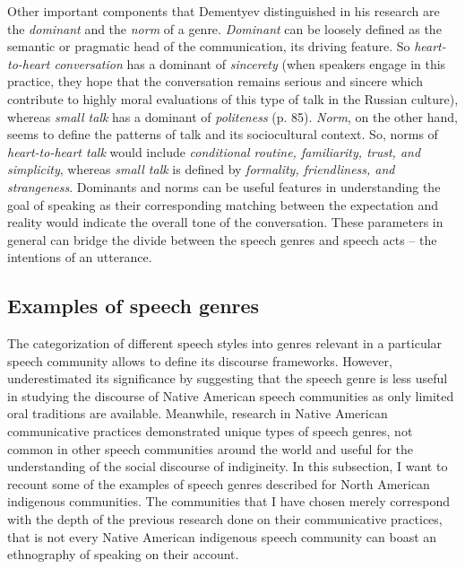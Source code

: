 \documentclass[12pt]{article}
\begin{document}
Other important components that Dementyev distinguished in his research are the \textit{dominant} and the \textit{norm} of a genre. \textit{Dominant} can be loosely defined as the semantic or pragmatic head of the communication, its driving feature. So \textit{heart-to-heart conversation} has a dominant of \textit{sincerety} (when speakers engage in this practice, they hope that the conversation remains serious and sincere which contribute to highly moral evaluations of this type of talk in the Russian culture), whereas \textit{small talk} has a dominant of \textit{politeness} (p. 85). \textit{Norm}, on the other hand, seems to define the patterns of talk and its sociocultural context. So, norms of \textit{heart-to-heart talk} would include \textit{conditional routine, familiarity, trust, and simplicity}, whereas \textit{small talk} is defined by \textit{formality, friendliness, and strangeness}. Dominants and norms can be useful features in understanding the goal of speaking as their corresponding matching between the expectation and reality would indicate the overall tone of the conversation. These parameters in general can bridge the divide between the speech genres and speech acts -- the intentions of an utterance. 
\subsection{Examples of speech genres}

The categorization of different speech styles into genres relevant in a particular speech community allows to define its discourse frameworks. However, \textcite[p. 102]{dementyev2015} underestimated its significance by suggesting that the speech genre is less useful in studying the discourse of Native American speech communities as only limited oral traditions are available. Meanwhile, research in Native American communicative practices demonstrated unique types of speech genres, not common in other speech communities around the world and useful for the understanding of the social discourse of indigineity. In this subsection, I want to recount some of the examples of speech genres described for North American indigenous communities. The communities that I have chosen merely correspond with the depth of the previous research done on their communicative practices, that is not every Native American indigenous speech community can boast an ethnography of speaking on their account.
\end{document}
